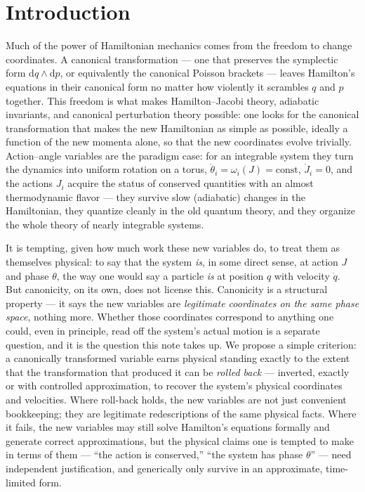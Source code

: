 \documentclass[11pt]{article}
\newcommand{\dd}{\mathrm{d}}
\begin{document}
\section{Introduction}

Much of the power of Hamiltonian mechanics comes from the freedom to change coordinates. A canonical transformation --- one that preserves the symplectic form $\dd q\wedge \dd p$, or equivalently the canonical Poisson brackets --- leaves Hamilton's equations in their canonical form no matter how violently it scrambles $q$ and $p$ together. This freedom is what makes Hamilton--Jacobi theory, adiabatic invariants, and canonical perturbation theory possible: one looks for the canonical transformation that makes the new Hamiltonian as simple as possible, ideally a function of the new momenta alone, so that the new coordinates evolve trivially. Action--angle variables are the paradigm case: for an integrable system they turn the dynamics into uniform rotation on a torus, $\dot\theta_i=\omega_i(J)=\text{const}$, $\dot J_i=0$, and the actions $J_i$ acquire the status of conserved quantities with an almost thermodynamic flavor --- they survive slow (adiabatic) changes in the Hamiltonian, they quantize cleanly in the old quantum theory, and they organize the whole theory of nearly integrable systems.

It is tempting, given how much work these new variables do, to treat them as themselves physical: to say that the system \emph{is}, in some direct sense, at action $J$ and phase $\theta$, the way one would say a particle \emph{is} at position $q$ with velocity $\dot q$. But canonicity, on its own, does not license this. Canonicity is a structural property --- it says the new variables are \emph{legitimate coordinates on the same phase space}, nothing more. Whether those coordinates correspond to anything one could, even in principle, read off the system's actual motion is a separate question, and it is the question this note takes up. We propose a simple criterion: a canonically transformed variable earns physical standing exactly to the extent that the transformation that produced it can be \emph{rolled back} --- inverted, exactly or with controlled approximation, to recover the system's physical coordinates and velocities. Where roll-back holds, the new variables are not just convenient bookkeeping; they are legitimate redescriptions of the same physical facts. Where it fails, the new variables may still solve Hamilton's equations formally and generate correct approximations, but the physical claims one is tempted to make in terms of them --- ``the action is conserved,'' ``the system has phase $\theta$'' --- need independent justification, and generically only survive in an approximate, time-limited form.
\end{document}

